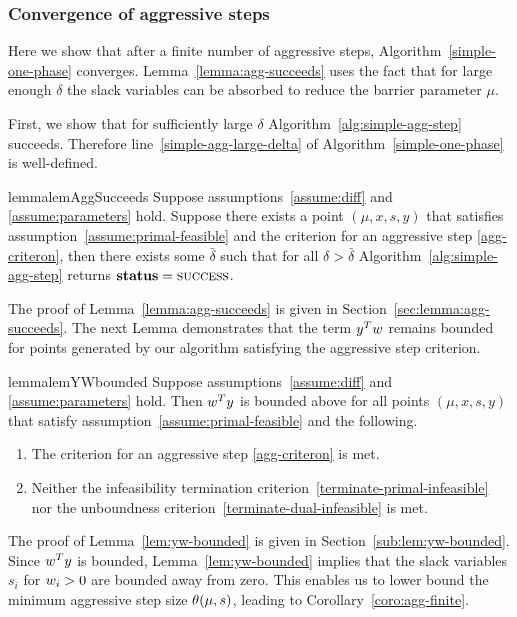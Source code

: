\documentclass{article}
\begin{document}
\subsubsection{Convergence of aggressive steps}
Here we show that after a finite number of aggressive steps, Algorithm~\ref{simple-one-phase} converges. Lemma~\ref{lemma:agg-succeeds} uses the fact that for large enough $\delta$ the slack variables can be absorbed to reduce the barrier parameter $\mu$. 

First, we show that for sufficiently large $\delta$ Algorithm~\ref{alg:simple-agg-step} succeeds. Therefore line~\ref{simple-agg-large-delta} of Algorithm~\ref{simple-one-phase} is well-defined. 

\begin{restatable}{lemma}{lemAggSucceeds}\label{lemma:agg-succeeds}
Suppose assumptions~\ref{assume:diff} and \ref{assume:parameters} hold. Suppose there exists a point $(\mu, x, s, y)$ that satisfies assumption~\ref{assume:primal-feasible} and the criterion for an aggressive step \eqref{agg-criteron}, then there exists some $\bar{\delta}$ such that for all $\delta > \bar{\delta}$ Algorithm~\ref{alg:simple-agg-step} returns $\textbf{status} = \textsc{success}$.
\end{restatable}

The proof of Lemma~\ref{lemma:agg-succeeds} is given in Section~\ref{sec:lemma:agg-succeeds}. The next Lemma demonstrates that the term $y^T w$ remains bounded for points generated by our algorithm satisfying the aggressive step criterion.

\begin{restatable}{lemma}{lemYWbounded}\label{lem:yw-bounded}
Suppose assumptions~\ref{assume:diff} and \ref{assume:parameters} hold. Then $w^T y$ is bounded above for all points $(\mu, x, s, y)$ that satisfy assumption~\ref{assume:primal-feasible} and the following.
\begin{enumerate}
\item The criterion for an aggressive step \eqref{agg-criteron} is met.
\item Neither the infeasibility termination criterion~\eqref{terminate-primal-infeasible} nor the unboundness criterion~\eqref{terminate-dual-infeasible} is met.
\end{enumerate}
\end{restatable}

The proof of Lemma~\ref{lem:yw-bounded} is given in Section~\ref{sub:lem:yw-bounded}. Since $w^T y$ is bounded, Lemma~\ref{lem:yw-bounded} implies that the slack variables $s_i$ for $w_i > 0$ are bounded away from zero. This enables us to lower bound the minimum aggressive step size $\theta(\mu, s)$, leading to Corollary~\ref{coro:agg-finite}.
\end{document}

